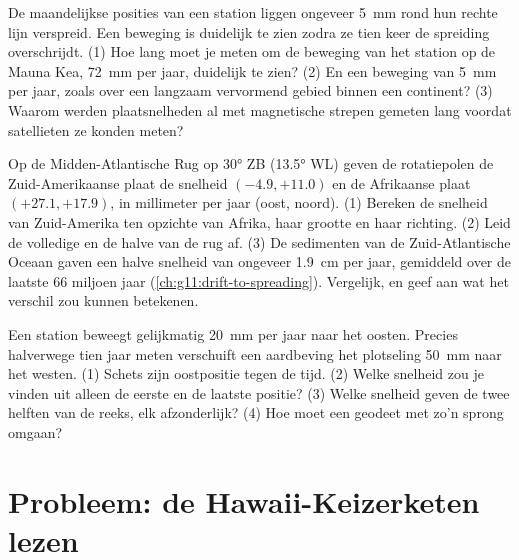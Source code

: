\begin{exercise}[$\star\star\star$]\label{exo:g11:plate-motions:13}
De maandelijkse posities van een station liggen ongeveer \qty{5}{mm} rond hun
rechte lijn verspreid. Een beweging is duidelijk te zien zodra ze tien keer de spreiding overschrijdt.
(1) Hoe lang moet je meten om de beweging van het station op de Mauna Kea,
\qty{72}{mm} per jaar, duidelijk te zien? (2) En een beweging van \qty{5}{mm} per jaar, zoals
over een langzaam vervormend gebied binnen een continent? (3) Waarom werden
plaatsnelheden al met magnetische strepen gemeten lang voordat satellieten ze
konden meten?
\end{exercise}

\begin{exercise}[$\star\star\star$]\label{exo:g11:plate-motions:14}
Op de Midden-Atlantische Rug op \ang{30} ZB (\ang{13.5} WL) geven de
rotatiepolen de Zuid-Amerikaanse plaat de snelheid $(-4.9, +11.0)$ en de
Afrikaanse plaat $(+27.1, +17.9)$, in millimeter per jaar (oost, noord).
(1) Bereken de snelheid van Zuid-Amerika ten opzichte van Afrika, haar grootte en haar
richting. (2) Leid de volledige en de halve  van de rug af.
(3) De sedimenten van de Zuid-Atlantische Oceaan gaven een halve snelheid van ongeveer \qty{1.9}{cm}
per jaar, gemiddeld over de laatste 66 miljoen jaar
(\cref{ch:g11:drift-to-spreading}). Vergelijk, en geef aan wat het verschil
zou kunnen betekenen.
\end{exercise}

\begin{exercise}[$\star\star\star$]\label{exo:g11:plate-motions:15}
Een station beweegt gelijkmatig \qty{20}{mm} per jaar naar het oosten. Precies halverwege
tien jaar meten verschuift een aardbeving het plotseling \qty{50}{mm}
naar het westen. (1) Schets zijn oostpositie tegen de tijd. (2) Welke snelheid
zou je vinden uit alleen de eerste en de laatste positie? (3) Welke snelheid geven
de twee helften van de reeks, elk afzonderlijk? (4) Hoe moet een
geodeet met zo'n sprong omgaan?
\end{exercise}

\section{Probleem: de Hawaii-Keizerketen lezen}

